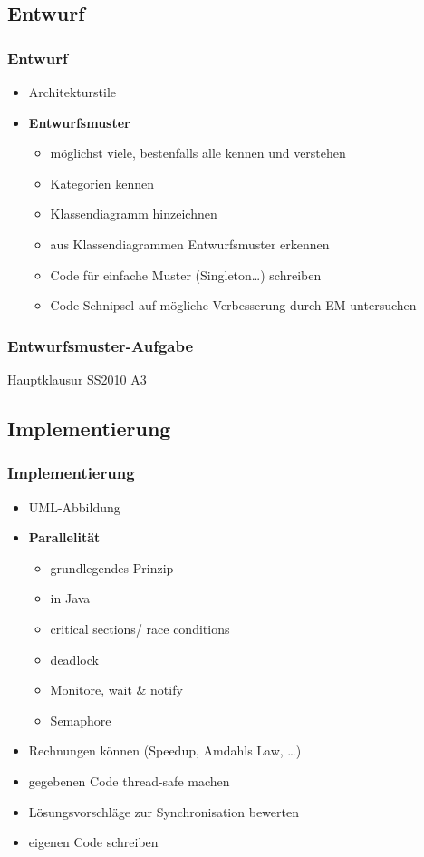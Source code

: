 \documentclass[18pt]{beamer}
\begin{document}
	\subsection{Entwurf}
	\begin{frame}
		\frametitle{Entwurf}
		\begin{itemize}
			\item Architekturstile \pause
			\item \textbf{Entwurfsmuster} \pause
			\begin{itemize}
				\item möglichst viele, bestenfalls alle kennen und verstehen \pause
				\item Kategorien kennen \pause
				\item Klassendiagramm hinzeichnen \pause
				\item aus Klassendiagrammen Entwurfsmuster erkennen \pause
				\item Code für einfache Muster (Singleton\dots) schreiben \pause
				\item Code-Schnipsel auf mögliche Verbesserung durch EM untersuchen
			\end{itemize}
		\end{itemize}
	\end{frame}

	\begin{frame}
		\frametitle{Entwurfsmuster-Aufgabe}
		\begin{huge}
				\centering Hauptklausur SS2010 A3
		\end{huge}
	\end{frame}

	
	\subsection{Implementierung}
	\begin{frame}
		\frametitle{Implementierung}
		\begin{itemize}
			\item UML-Abbildung \pause
			\item \textbf{Parallelität} \pause
			\begin{itemize}
				\item grundlegendes Prinzip \pause
				\item in Java \pause
				\item critical sections/ race conditions \pause
				\item deadlock \pause
				\item Monitore, wait \& notify \pause
				\item Semaphore \pause
			\end{itemize}
			\item Rechnungen können (Speedup, Amdahls Law, \dots) \pause
			\item gegebenen Code thread-safe machen \pause
			\item Lösungsvorschläge zur Synchronisation bewerten \pause
			\item eigenen Code schreiben
		\end{itemize}
	\end{frame}
\end{document}
